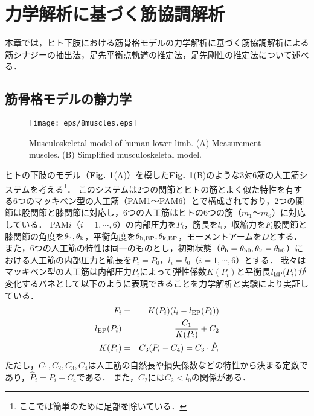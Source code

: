 \section{力学解析に基づく筋協調解析}
本章では，ヒト下肢における筋骨格モデルの力学解析に基づく筋協調解析による筋シナジーの抽出法，足先平衡点軌道の推定法，足先剛性の推定法について述べる．

\subsection{筋骨格モデルの静力学}
%
\begin{figure}[!t]
 \begin{center}
  \texttt{[image: eps/8muscles.eps]}
  \caption{Musculoskeletal model of human lower limb. (A) Measurement muscles. (B) Simplified musculoskeletal model.}
  \label{8muscles}
 \end{center}
\end{figure}
%
ヒトの下肢のモデル（{\bf Fig. \ref{8muscles}}(A)）を模した{\bf Fig. \ref{8muscles}}(B)のような3対6筋の人工筋システムを考える\footnote{ここでは簡単のために足部を除いている．}．
このシステムは2つの関節とヒトの筋とよく似た特性を有する6つのマッキベン型の人工筋（PAM1～PAM6）とで構成されており，2つの関節は股関節と膝関節に対応し，6つの人工筋はヒトの6つの筋（$m_1$～$m_6$）に対応している．
PAM$i$（$i=1,\cdots,6$）の内部圧力を$P_i$，筋長を$l_i$，収縮力を$F_i$股関節と膝関節の角度を$\theta_{\rm h},\theta_{\rm k}$，平衡角度を$\theta_{\rm h,EP},\theta_{\rm k,EP}$，モーメントアームを$D$とする．
また，6つの人工筋の特性は同一のものとし，初期状態（$\theta_{\rm h}=\theta_{{\rm h}0},\theta_{\rm k}=\theta_{{\rm k}0}$）における人工筋の内部圧力と筋長を$P_i=P_0$，$l_i=l_0$（$i=1,\cdots,6$）とする．
我々はマッキベン型の人工筋は内部圧力$P_i$によって弾性係数$K(P_i)$と平衡長$l_{\rm EP}(P_i)$が変化するバネとして以下のように表現できることを力学解析と実験により実証している\cite{Ariga2013}．
\begin{eqnarray}
 \label{model1}
 F_i&=&K(P_i)(l_i-l_{\rm EP}(P_i))\\
 \label{model2}
 l_{\rm EP}(P_i)&=&\frac{C_1}{K(P_i)}+C_2\\
 \label{model3}
 K(P_i)&=&C_3(P_i-C_4)=C_3\cdot\hat{P}_i
\end{eqnarray}
ただし，$C_1,C_2,C_3,C_4$は人工筋の自然長や損失係数などの特性から決まる定数であり，$\hat{P}_i=P_i-C_4$である．
また，$C_2$には$C_2<l_0$の関係がある．

